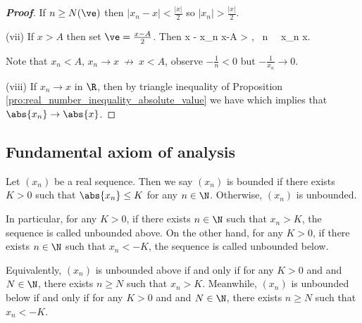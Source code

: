 \begin{proof}[\bf Proof]
If $n \geq N(\ve)$ then $|x_n - x| < \frac{|x|}{2}$ so $|x_n| > \frac{|x|}{2}$.

\item [(vii)] If $x > A$ then set $\ve = \frac{x-A}{2}$. Then
\be
x - x_n \geq x-A > \ve, \ \forall n \ \ra \ x_n \not\to x. %
\ee

Note that $x_n < A$, $x_n \to x \ \not\to\ x < A$, observe $-\frac{1}{n} < 0$ but $-\frac{1}{x_n} \to 0$.

\item [(viii)] If $x_n\to x$ in $\R$, then by triangle inequality of Proposition \ref{pro:real_number_inequality_absolute_value} we have
\be
{} \leq {} 
\ee
which implies that $\abs{x_n} \to \abs{x}$.
\een
\end{proof}



\subsection{Fundamental axiom of analysis}


\begin{definition}
Let $(x_n)$ be a real sequence. Then we say $(x_n)$ is bounded if there exists $K>0$ such that $\abs{x_n} \leq K$ for any $n\in \N$. Otherwise, $(x_n)$ is unbounded.

In particular, for any $K>0$, if there exists $n\in\N$ such that $x_n > K$, the sequence is called unbounded above. On the other hand, for any $K>0$, if there exists $n\in\N$ such that $x_n < -K$, the sequence is called unbounded below.
\end{definition}

\begin{remark}
Equivalently, $(x_n)$ is unbounded above if and only if for any $K>0$ and and $N\in \N$, there exists $n\geq N$ such that $x_n > K$. Meanwhile, $(x_n)$ is unbounded below if and only if for any $K>0$ and and $N\in \N$, there exists $n\geq N$ such that $x_n < -K$.
\end{remark}


%


